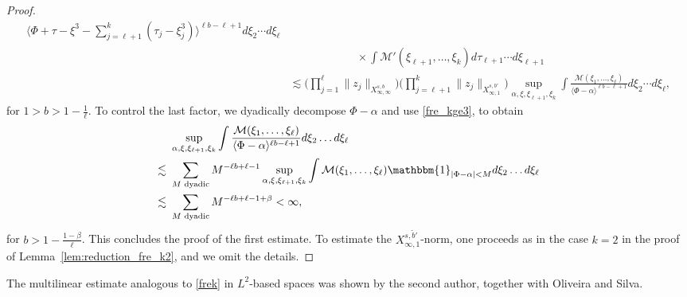 \documentclass[%
11pt,  reqno]{amsart}
\newcommand{\fia}{\mathbbm{1}_{|\Phi-\alpha|<M}}
\newcommand{\jap}[1]{\langle #1 \rangle}
\newcommand{\5}{\textup{V}}
\newcommand{\les}{\lesssim}
\newcommand{\wt}{\widetilde}
\theoremstyle{remark}
\newcommand{\be}{\beta}
\renewcommand{\l}{\ell}
\numberwithin{equation}{section}
\numberwithin{theorem}{section}
\begin{document}
\begin{proof}
\begin{align*}
{                }{ \jap{\Phi + \tau-\xi^3 - \sum_{j=\ell+1}^k (\tau_j-\xi_j^3)}^{\ell b - \ell +1}} d\xi_2\cdots d\xi_\ell  \\
                & \qquad \qquad \qquad \times \int  \mathcal{M}' (\xi_{\l+1}, \ldots, \xi_k) 
                d\tau_{\ell+1}\cdots  d\xi_{\ell+1}
				\\
                &
                \les 
                \bigg(\prod_{j=1}^\ell \|z_j\|_{X_{\infty,\infty}^{s,b}}
                \bigg) \bigg( \prod_{j=\l+1}^k \|z_j\|_{X^{s, b'}_{\infty, 1}} \bigg)
                \sup_{{\alpha,  \xi, \xi_{\ell+1}, \xi_k}} \int  \frac{\mathcal{M}(\xi_1, \ldots, \xi_\l)}{ \jap{\Phi -\alpha}^{\ell b - \ell +1}} d\xi_2\cdots d\xi_\ell
                , 
			\end{align*}
for $1>b> 1- \frac1\l$.
			To control the last factor, we dyadically decompose  $\Phi-\alpha$ and use \eqref{fre_kge3}, to obtain
			\begin{align*}
				&\sup_{{\alpha,  \xi, \xi_{\ell+1}, \xi_k}} \int  \frac{\mathcal{M}(\xi_1, \ldots, \xi_\l)}{ \jap{\Phi -\alpha}^{\ell b - \ell +1}} d\xi_2\dots d\xi_\ell \\\lesssim\ & \sum_{M \text{ dyadic}} M^{-\ell b +\ell-1} \sup_{{\alpha,  \xi, \xi_{\ell+1}, \xi_k}} \int \mathcal{M}(\xi_1, \ldots, \xi_\l) \fia d\xi_2\dots d\xi_\ell \\\lesssim\ & \sum_{M \text{ dyadic}} M^{-\ell b +\ell-1+\beta} <\infty, 
			\end{align*}
            for $b > 1 - \frac{1-\be}{\l}$. 
			This concludes the proof of the first estimate. To estimate the $X^{s, \wt b'}_{\infty,1}$-norm, one proceeds as in the case $k=2$ in the proof of Lemma~\ref{lem:reduction_fre_k2}, and we omit the details.
\qedhere

            
		\end{proof}


        The multilinear estimate analogous to \eqref{frek} in $L^2$-based spaces was shown by the second author,  together with Oliveira and Silva.

        
		
\end{document}
